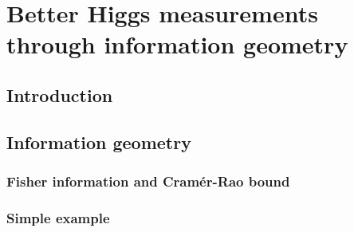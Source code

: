 





\chapter{Better Higgs measurements through information geometry}
\label{chapter:information}


\section{Introduction}
\label{sec:information_intro}

\section{Information geometry}
\label{sec:information_formalism}

\subsection{Fisher information and Cram\'er-Rao bound}

\subsection{Simple example}



